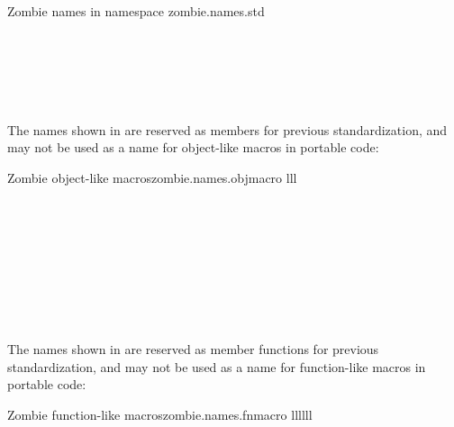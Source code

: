 \begin{multicolfloattable}{Zombie names in namespace }{zombie.names.std}
  \\
  \\
  \\
  \\
  \\
  \\
\end{multicolfloattable}


\pnum
The names shown in  are reserved as members for
previous standardization, and may not be used as a name for object-like macros
in portable code:

\begin{multicolfloattable}{Zombie object-like macros}{zombie.names.objmacro}
{lll}
  \\
  \\
  \\
\columnbreak
{}  \\
  \\
  \\
\columnbreak
{}  \\
  \\
  \\
\end{multicolfloattable}


\pnum
The names shown in  are reserved as member functions
for previous standardization, and may not be used as a name for function-like
macros in portable code:

\begin{multicolfloattable}{Zombie function-like macros}{zombie.names.fnmacro}
{llllll}
  \\
\columnbreak
{}  \\
\columnbreak
{}  \\
\columnbreak
{}  \\
\columnbreak
{}  \\
\columnbreak
{}  \\
\end{multicolfloattable}

